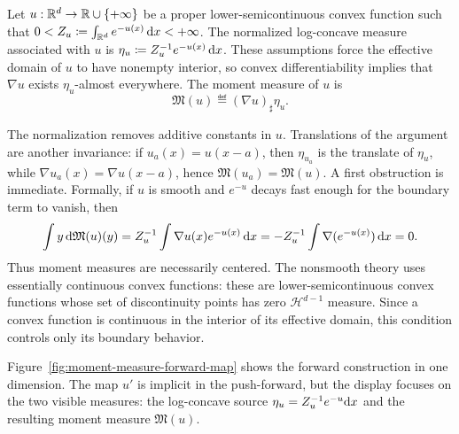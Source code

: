 \begin{defn}\label{def-moment-measure}
	Let $u:\mathbb{R}^d\to\mathbb{R}\cup\{+\infty\}$ be a proper lower-semicontinuous convex function such that $0<Z_u\coloneqq \int_{\mathbb{R}^d} e^{-u(x)}\,\mathrm{d} x <+\infty$. The normalized log-concave measure associated with $u$ is $\eta_u \coloneqq Z_u^{-1} e^{-u(x)}\,\mathrm{d} x$.
	These assumptions force the effective domain of $u$ to have nonempty interior, so convex differentiability implies that $\nabla u$ exists $\eta_u$-almost everywhere. The moment measure of $u$ is
	\[
		\mathfrak M(u)\eqdef (\nabla u)_\sharp \eta_u.
	\]
\end{defn}

The normalization removes additive constants in $u$. Translations of the argument are another invariance: if $u_a(x)=u(x-a)$, then $\eta_{u_a}$ is the translate of $\eta_u$, while $\nabla u_a(x)=\nabla u(x-a)$, hence $\mathfrak M(u_a)=\mathfrak M(u)$. A first obstruction is immediate. Formally, if $u$ is smooth and $e^{-u}$ decays fast enough for the boundary term to vanish, then
\[
	\int y\,\mathrm{d}\mathfrak M(u)(y)
	=
	Z_u^{-1}\int \nabla u(x)e^{-u(x)}\,\mathrm{d} x
	=
	-Z_u^{-1}\int \nabla(e^{-u(x)})\,\mathrm{d} x
	=0.
\]
Thus moment measures are necessarily centered. The nonsmooth theory uses essentially continuous convex functions: these are lower-semicontinuous convex functions whose set of discontinuity points has zero $\mathcal H^{d-1}$ measure. Since a convex function is continuous in the interior of its effective domain, this condition controls only its boundary behavior.

Figure~\ref{fig:moment-measure-forward-map} shows the forward construction in one dimension. The map $u'$ is implicit in the push-forward, but the display focuses on the two visible measures: the log-concave source $\eta_u=Z_u^{-1}e^{-u}\mathrm{d} x$ and the resulting moment measure $\mathfrak M(u)$.

